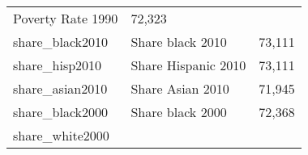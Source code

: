 \documentclass[]{book}
\begin{document}
\begin{longtable}[]{@{}lll@{}}
\begin{minipage}[t]{0.04\columnwidth}
Poverty Rate 1990\strut
\end{minipage} & \begin{minipage}[t]{0.04\columnwidth}\raggedright\strut
72,323\strut
\end{minipage}\tabularnewline
\begin{minipage}[t]{0.04\columnwidth}\raggedright\strut
share\_black2010\strut
\end{minipage} & \begin{minipage}[t]{0.04\columnwidth}\raggedright\strut
Share black 2010\strut
\end{minipage} & \begin{minipage}[t]{0.04\columnwidth}\raggedright\strut
73,111\strut
\end{minipage}\tabularnewline
\begin{minipage}[t]{0.04\columnwidth}\raggedright\strut
share\_hisp2010\strut
\end{minipage} & \begin{minipage}[t]{0.04\columnwidth}\raggedright\strut
Share Hispanic 2010\strut
\end{minipage} & \begin{minipage}[t]{0.04\columnwidth}\raggedright\strut
73,111\strut
\end{minipage}\tabularnewline
\begin{minipage}[t]{0.04\columnwidth}\raggedright\strut
share\_asian2010\strut
\end{minipage} & \begin{minipage}[t]{0.04\columnwidth}\raggedright\strut
Share Asian 2010\strut
\end{minipage} & \begin{minipage}[t]{0.04\columnwidth}\raggedright\strut
71,945\strut
\end{minipage}\tabularnewline
\begin{minipage}[t]{0.04\columnwidth}\raggedright\strut
share\_black2000\strut
\end{minipage} & \begin{minipage}[t]{0.04\columnwidth}\raggedright\strut
Share black 2000\strut
\end{minipage} & \begin{minipage}[t]{0.04\columnwidth}\raggedright\strut
72,368\strut
\end{minipage}\tabularnewline
\begin{minipage}[t]{0.04\columnwidth}\raggedright\strut
share\_white2000\strut
\end{minipage} & \begin{minipage}[t]{0.04\columnwidth}\raggedright\strut

\end{minipage}
\end{longtable}
\end{document}

